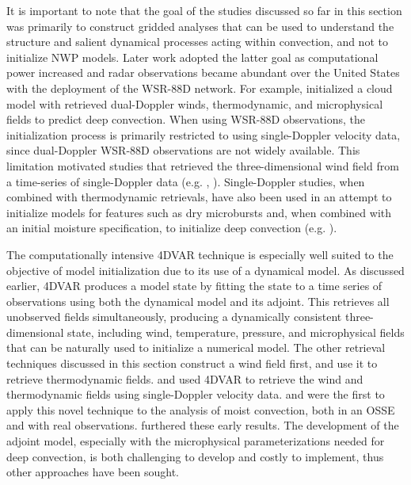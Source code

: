 It is important to note that the goal of the studies discussed so far in this section was primarily to construct gridded analyses that can be used to understand the structure and salient dynamical processes acting within convection, and not to initialize NWP models. Later work adopted the latter goal as computational power increased and radar observations became abundant over the United States with the deployment of the WSR-88D network. For example, \citet{linetal93} initialized a cloud model with retrieved dual-Doppler winds, thermodynamic, and microphysical fields to predict deep convection. When using WSR-88D observations, the initialization process is primarily restricted to using single-Doppler velocity data, since dual-Doppler WSR-88D observations are not widely available. This limitation motivated studies that retrieved the three-dimensional wind field from a time-series of single-Doppler data (e.g. \citealt{shapiroetal95}, \citealt{gaoetal01}). Single-Doppler studies, when combined with thermodynamic retrievals, have also been used in an attempt to initialize models for features such as dry microbursts \citep{crooktuttle94} and, when combined with an initial moisture specification, to initialize deep convection (e.g. \citealt{weygandtetal02a}). 

The computationally intensive 4DVAR technique is especially well suited to the objective of model initialization due to its use of a dynamical model. As discussed earlier, 4DVAR produces a model state by fitting the state to a time series of observations using both the dynamical model and its adjoint. This retrieves all unobserved fields simultaneously, producing a dynamically consistent three-dimensional state, including wind, temperature, pressure, and microphysical fields that can be naturally used to initialize a numerical model. The other retrieval techniques discussed in this section construct a wind field first, and use it to retrieve thermodynamic fields. \citet{sunetal91} and \citet{suncrook94} used 4DVAR to retrieve the wind and thermodynamic fields using single-Doppler velocity data. \citet{suncrook97} and \citet{suncrook98} were the first to apply this novel technique to the analysis of moist convection, both in an OSSE and with real observations. \citet{wuetal00} furthered these early results. The development of the adjoint model, especially with the microphysical parameterizations needed for deep convection, is both challenging to develop and costly to implement, thus other approaches have been sought.

